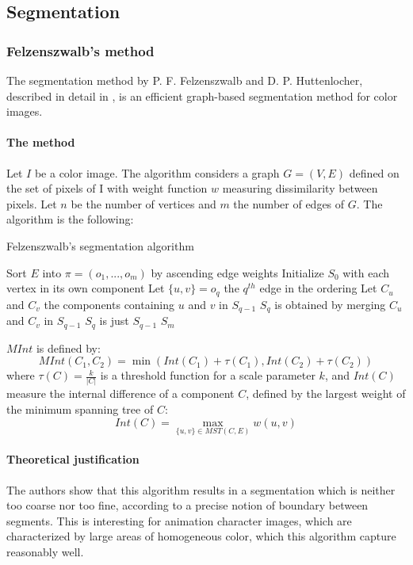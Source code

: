 \subsection{Segmentation}
\subsubsection{Felzenszwalb's method}
The segmentation method by P. F. Felzenszwalb and D. P. Huttenlocher, described in detail in \cite{felzenszwalb2004efficient}, is an efficient graph-based segmentation method for color images.

\paragraph{The method} Let $I$ be a color image. The algorithm considers a graph $G = (V,E)$ defined on the set of pixels of I with weight function $w$ measuring dissimilarity between pixels. Let $n$ be the number of vertices and $m$ the number of edges of $G$. The algorithm is the following:

\begin{algorithm}
\caption{Felzenszwalb's segmentation algorithm}
\label{alg:felzenszwalb}

\begin{algorithmic}[1]
\State Sort $E$ into $\pi = (o_1, ..., o_m)$ by ascending edge weights
\State Initialize $S_0$ with each vertex in its own component
\State Let $\{u,v\} = o_q$ the $q^{th}$ edge in the ordering
\State Let $C_u$ and $C_v$ the components containing $u$ and $v$ in $S_{q-1}$
\State $S_q$ is obtained by merging $C_u$ and $C_v$ in $S_{q-1}$
\Else
\State $S_q$ is just $S_{q-1}$
\EndIf
\EndFor
\Return $S_m$
\EndFunction
\end{algorithmic}
\end{algorithm}

$MInt$ is defined by:
\[
MInt(C_1, C_2) = \min(Int(C_1) + \tau(C_1), Int(C_2) + \tau(C_2))
\]
where $\tau(C) = \frac{k}{|C|}$ is a threshold function for a scale parameter $k$, and $Int(C)$ measure the internal difference of a component $C$, defined by
the largest weight of the minimum spanning tree of $C$:
\[
Int(C) = \max_{\{u,v\} \in MST(C, E)} w(u,v)
\]


\paragraph{Theoretical justification} The authors show that this algorithm results in a segmentation which is neither too coarse nor too fine, according to a precise notion of boundary between segments. This is interesting for animation character images, which are characterized by large areas of homogeneous color, which this algorithm capture reasonably well.

